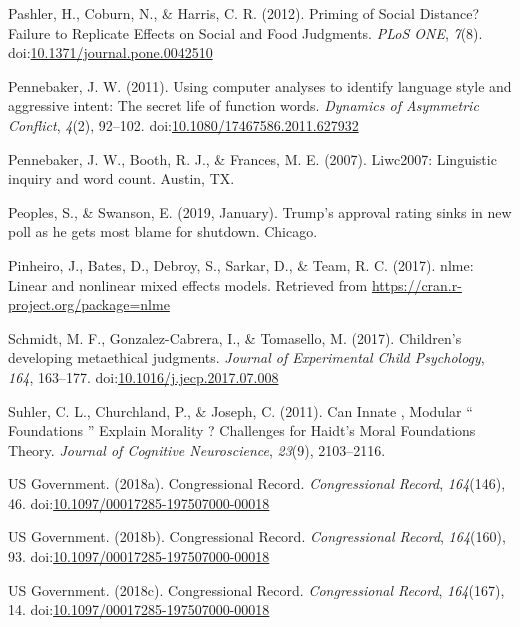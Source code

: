 \documentclass[english,,man]{apa6}
\begin{document}
\hypertarget{ref-Pashler2012}{}
Pashler, H., Coburn, N., \& Harris, C. R. (2012). Priming of Social
Distance? Failure to Replicate Effects on Social and Food Judgments.
\emph{PLoS ONE}, \emph{7}(8).
doi:\href{https://doi.org/10.1371/journal.pone.0042510}{10.1371/journal.pone.0042510}

\hypertarget{ref-Pennebaker2011}{}
Pennebaker, J. W. (2011). Using computer analyses to identify language
style and aggressive intent: The secret life of function words.
\emph{Dynamics of Asymmetric Conflict}, \emph{4}(2), 92--102.
doi:\href{https://doi.org/10.1080/17467586.2011.627932}{10.1080/17467586.2011.627932}

\hypertarget{ref-Pennebaker2007}{}
Pennebaker, J. W., Booth, R. J., \& Frances, M. E. (2007). Liwc2007:
Linguistic inquiry and word count. Austin, TX.

\hypertarget{ref-Peoples2019}{}
Peoples, S., \& Swanson, E. (2019, January). Trump's approval rating
sinks in new poll as he gets most blame for shutdown. Chicago.

\hypertarget{ref-Pinheiro2017}{}
Pinheiro, J., Bates, D., Debroy, S., Sarkar, D., \& Team, R. C. (2017).
nlme: Linear and nonlinear mixed effects models. Retrieved from
\url{https://cran.r-project.org/package=nlme}

\hypertarget{ref-Schmidt2017}{}
Schmidt, M. F., Gonzalez-Cabrera, I., \& Tomasello, M. (2017).
Children's developing metaethical judgments. \emph{Journal of
Experimental Child Psychology}, \emph{164}, 163--177.
doi:\href{https://doi.org/10.1016/j.jecp.2017.07.008}{10.1016/j.jecp.2017.07.008}

\hypertarget{ref-Suhler2011}{}
Suhler, C. L., Churchland, P., \& Joseph, C. (2011). Can Innate ,
Modular `` Foundations '' Explain Morality ? Challenges for Haidt's
Moral Foundations Theory. \emph{Journal of Cognitive Neuroscience},
\emph{23}(9), 2103--2116.

\hypertarget{ref-USGovernment2018b}{}
US Government. (2018a). Congressional Record. \emph{Congressional
Record}, \emph{164}(146), 46.
doi:\href{https://doi.org/10.1097/00017285-197507000-00018}{10.1097/00017285-197507000-00018}

\hypertarget{ref-USGovernment2018}{}
US Government. (2018b). Congressional Record. \emph{Congressional
Record}, \emph{164}(160), 93.
doi:\href{https://doi.org/10.1097/00017285-197507000-00018}{10.1097/00017285-197507000-00018}

\hypertarget{ref-USGovernment2018a}{}
US Government. (2018c). Congressional Record. \emph{Congressional
Record}, \emph{164}(167), 14.
doi:\href{https://doi.org/10.1097/00017285-197507000-00018}{10.1097/00017285-197507000-00018}
\end{document}
